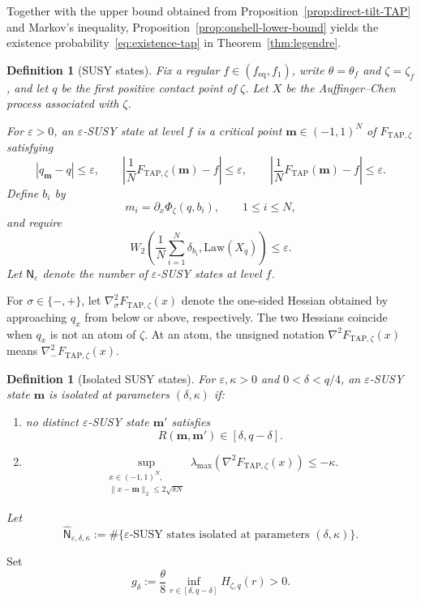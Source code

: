 \documentclass[a4paper,10pt,reqno]{amsart}
\numberwithin{equation}{section}
\newtheorem{definition}[proposition]{Definition}%
\newcommand{\ve}{\varepsilon}
\newcommand{\Law}{\mathrm{Law}}
\newcommand{\TAP}{\mathrm{TAP}}
\newcommand{\eq}{\mathrm{eq}}
\newcommand{\bfm}{\mathbf{m}}
\begin{document}
	Together with the upper bound obtained from
	Proposition~\ref{prop:direct-tilt-TAP} and Markov's inequality,
	Proposition~\ref{prop:onshell-lower-bound} yields the existence
	probability~\eqref{eq:existence-tap} in
	Theorem~\ref{thm:legendre}.
	
	\begin{definition}[SUSY states]\label{def:susy-state}
		Fix a regular \(f\in(f_{\eq},f_1)\), write \(\theta=\theta_f\) and
		\(\zeta=\zeta_f\), and let \(q\) be the first positive contact point of
		\(\zeta\). Let \(X\) be the Auffinger--Chen process associated with
		\(\zeta\).
		
		For \(\ve>0\), an \(\ve\)-SUSY state at level \(f\) is a
		critical point \(\bfm\in(-1,1)^N\) of \(F_{\TAP,\zeta}\) satisfying
		\[
		|q_\bfm-q|\le\ve,
		\qquad
		\left|\frac1N F_{\TAP,\zeta}(\bfm)-f\right|\le\ve,
		\qquad
		\left|\frac1N F_{\TAP}(\bfm)-f\right|\le\ve.
		\]
		Define \(b_i\) by
		\[
		m_i=\partial_x\Phi_\zeta(q,b_i),
		\qquad 1\le i\le N,
		\]
		and require
		\[
		W_2\left(
		\frac1N\sum_{i=1}^N\delta_{b_i},
		\Law(X_q)
		\right)\le\ve.
		\]
		Let \(\mathsf N_\ve\) denote the number of
		\(\ve\)-SUSY states at level \(f\).
	\end{definition}
	
	For \(\sigma\in\{-,+\}\), let
	\(\nabla_\sigma^2F_{\TAP,\zeta}(x)\) denote the one-sided Hessian obtained
	by approaching \(q_x\) from below or above, respectively. The two Hessians
	coincide when \(q_x\) is not an atom of \(\zeta\). At an atom, the unsigned
	notation \(\nabla^2F_{\TAP,\zeta}(x)\) means
	\(\nabla_-^2F_{\TAP,\zeta}(x)\).
	
	\begin{definition}[Isolated SUSY states]\label{def:isolated-susy-state}
		For \(\ve,\kappa>0\) and \(0<\delta<q/4\), an
		\(\ve\)-SUSY state \(\bfm\) is isolated at parameters
		\((\delta,\kappa)\) if:
		\begin{enumerate}[label=\textup{(\roman*)}]
			\item no distinct \(\ve\)-SUSY state \(\bfm'\)
			satisfies
			\[
			R(\bfm,\bfm')\in[\delta,q-\delta].
			\]
			\item
			\[
			\sup_{\substack{
					x\in(-1,1)^N,\\
					\|x-\bfm\|_2\le2\sqrt{\delta N}
			}}
			\lambda_{\max}\!\left(
			\nabla^2F_{\TAP,\zeta}(x)
			\right)
			\le-\kappa.
			\]
		\end{enumerate}
		Let
		\[
		\widehat{\mathsf N}_{\ve,\delta,\kappa}
		:=
		\#\{\text{\(\ve\)-SUSY states isolated at parameters
			\((\delta,\kappa)\)}\}.
		\]
	\end{definition}
	Set
	\begin{equation}\label{eq:susy-intermediate-gap}
		g_\delta
		:=
		\frac{\theta}{8}
		\inf_{r\in[\delta,q-\delta]}H_{\zeta,q}(r)>0.
	\end{equation}
	
\end{document}
